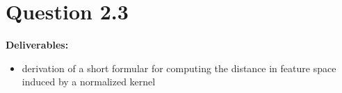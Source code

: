 \section*{Question 2.3}

\textbf{Deliverables:}

\begin{itemize}

	\item derivation of a short formular for computing the distance in feature space induced by a normalized kernel
\end{itemize}
